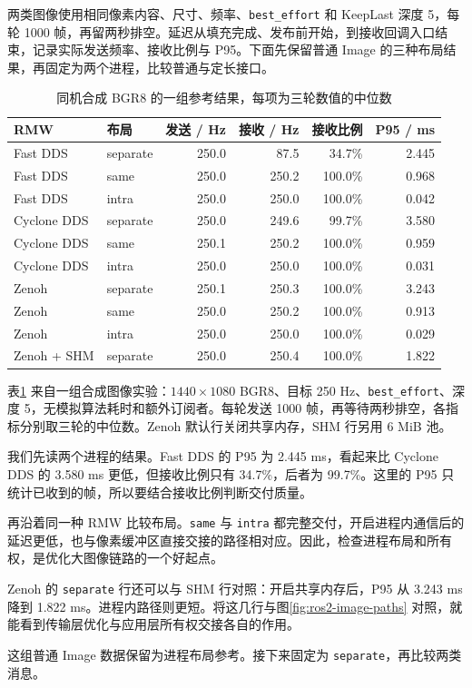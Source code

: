 \begin{example}
两类图像使用相同像素内容、尺寸、频率、\texttt{best\_effort} 和 KeepLast 深度 5，每轮 1000 帧，再留两秒排空。延迟从填充完成、发布前开始，到接收回调入口结束，记录实际发送频率、接收比例与 P95。下面先保留普通 Image 的三种布局结果，再固定为两个进程，比较普通与定长接口。

\begin{table}[htbp]
\centering
\small
\caption{同机合成 BGR8 的一组参考结果，每项为三轮数值的中位数}
\label{tab:ros2-image-results}
\begin{tabular}{llrrrr}
\toprule
RMW & 布局 & 发送 / Hz & 接收 / Hz & 接收比例 & P95 / ms\\
\midrule
Fast DDS & separate & 250.0 & 87.5 & 34.7\% & 2.445\\
Fast DDS & same & 250.0 & 250.2 & 100.0\% & 0.968\\
Fast DDS & intra & 250.0 & 250.0 & 100.0\% & 0.042\\
\midrule
Cyclone DDS & separate & 250.0 & 249.6 & 99.7\% & 3.580\\
Cyclone DDS & same & 250.1 & 250.2 & 100.0\% & 0.959\\
Cyclone DDS & intra & 250.0 & 250.0 & 100.0\% & 0.031\\
\midrule
Zenoh & separate & 250.1 & 250.3 & 100.0\% & 3.243\\
Zenoh & same & 250.0 & 250.2 & 100.0\% & 0.913\\
Zenoh & intra & 250.0 & 250.0 & 100.0\% & 0.029\\
Zenoh + SHM & separate & 250.0 & 250.4 & 100.0\% & 1.822\\
\bottomrule
\end{tabular}
\end{table}
表\ref{tab:ros2-image-results} 来自一组合成图像实验：$1440\times1080$ BGR8、目标 250 Hz、\texttt{best\_effort}、深度 5，无模拟算法耗时和额外订阅者。每轮发送 1000 帧，再等待两秒排空，各指标分别取三轮的中位数。Zenoh 默认行关闭共享内存，SHM 行另用 6 MiB 池。

我们先读两个进程的结果。Fast DDS 的 P95 为 2.445 ms，看起来比 Cyclone DDS 的 3.580 ms 更低，但接收比例只有 34.7\%，后者为 99.7\%。这里的 P95 只统计已收到的帧，所以要结合接收比例判断交付质量。

再沿着同一种 RMW 比较布局。\texttt{same} 与 \texttt{intra} 都完整交付，开启进程内通信后的延迟更低，也与像素缓冲区直接交接的路径相对应。因此，检查进程布局和所有权，是优化大图像链路的一个好起点。

Zenoh 的 \texttt{separate} 行还可以与 SHM 行对照：开启共享内存后，P95 从 3.243 ms 降到 1.822 ms。进程内路径则更短。将这几行与图\ref{fig:ros2-image-paths} 对照，就能看到传输层优化与应用层所有权交接各自的作用。

这组普通 Image 数据保留为进程布局参考。接下来固定为 \texttt{separate}，再比较两类消息。

\end{example}

